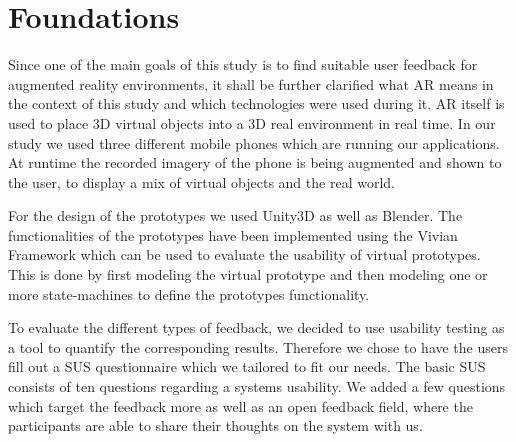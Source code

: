 \documentclass[11pt, a4paper]{article}
\begin{document}
	\section*{Foundations}\label{sec:foundations}
		Since one of the main goals of this study is to find suitable user feedback for augmented reality environments, it shall be further clarified what \ac{AR} means in the context of this study and which technologies were used during it. \ac{AR} itself is used to place 3D virtual objects into a 3D real environment in real time. In our study we used three different mobile phones which are running our applications. At runtime the recorded imagery of the phone is being augmented and shown to the user, to display a mix of virtual objects and the real world.

		For the design of the prototypes we used Unity3D as well as Blender. The functionalities of the prototypes have been implemented using the Vivian Framework which can be used to evaluate the usability of virtual prototypes. This is done by first modeling the virtual prototype and then modeling one or more state-machines to define the prototypes functionality.

		To evaluate the different types of feedback, we decided to use usability testing as a tool to quantify the corresponding results. Therefore we chose to have the users fill out a \ac{SUS} questionnaire which we tailored to fit our needs. The basic \ac{SUS} consists of ten questions regarding a systems usability. We added a few questions which target the feedback more as well as an open feedback field, where the participants are able to share their thoughts on the system with us.

\end{document}
